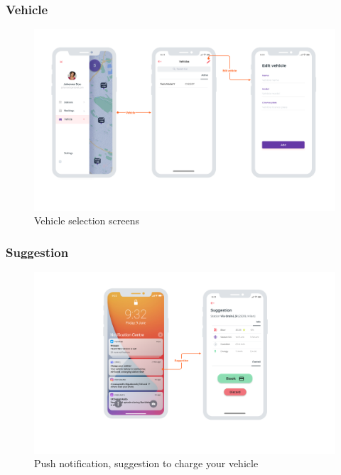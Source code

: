 \subsubsection{Vehicle}
\begin{center}
    \begin{figure}[H]
        \includegraphics[width=\textwidth]{./img/design/app/Vehicles.png}
        \caption{Vehicle selection screens}
    \end{figure}
\end{center}

\subsubsection{Suggestion}
\begin{center}
    \begin{figure}[H]
        \includegraphics[width=\textwidth]{./img/design/app/Suggestion.png}
        \caption{Push notification, suggestion to charge your vehicle}
    \end{figure}
\end{center}



